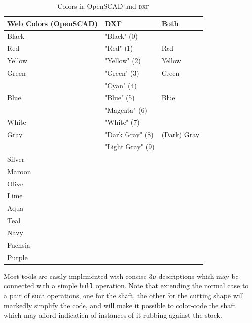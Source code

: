 \documentclass{ltxdoc}
\begin{document}
\begin{table}[h!]
\centering
\caption{Colors in OpenSCAD and \textsc{dxf}}
\label{tab:example}
\begin{tabular}{lll}
\toprule
\textbf{Web Colors (OpenSCAD)} & \textbf{\textsc{DXF}} & \textbf{Both} \\
\midrule
Black    & "Black" (0)                        \\
Red      & "Red" (1)           & Red          \\ 
Yellow   & "Yellow" (2)        & Yellow       \\  
Green    & "Green" (3)         & Green        \\
         & "Cyan" (4)                    \\
Blue     & "Blue" (5)          & Blue         \\
         & "Magenta" (6)                 \\
White    & "White" (7)                        \\
Gray     & "Dark Gray" (8)     & (Dark) Gray  \\
         & "Light Gray" (9)                   \\
Silver \\
Maroon \\
Olive \\
Lime \\
Aqua \\
Teal \\
Navy \\
Fuchsia \\
Purple \\
\bottomrule
\end{tabular}
{\par\noindent{}\par
\vspace*{\baselineskip}}
\end{table}

Most tools are easily implemented with concise \textsc{3d} descriptions which may be connected with a simple \texttt{hull} operation. Note that extending the normal case to a pair of such operations, one for the shaft, the other for the cutting shape will markedly simplify the code, and will make it possible to color-code the shaft which may afford indication of instances of it rubbing against the stock.
\end{document}
